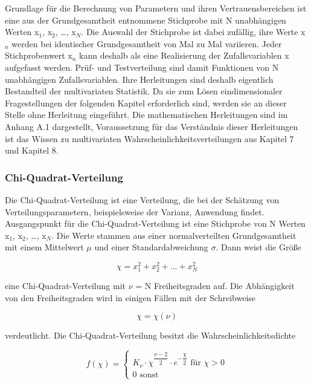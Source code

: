 \noindent Grundlage f\"{u}r die Berechnung von Parametern und ihren Vertrauensbereichen ist eine aus der Grundgesamtheit entnommene Stichprobe mit N unabh\"{a}ngigen Werten x${}_{1}$, x${}_{2}$, {\dots}, x${}_{N}$. Die Auswahl der Stichprobe ist dabei zuf\"{a}llig, ihre Werte x${}_{n}$ werden bei identischer Grundgesamtheit von Mal zu Mal variieren. Jeder Stichprobenwert x${}_{n}$ kann deshalb als eine Realisierung der Zufallsvariablen x aufgefasst werden. Pr\"{u}f- und Testverteilung sind damit Funktionen von N unabh\"{a}ngigen Zufallsvariablen. Ihre Herleitungen sind deshalb eigentlich Bestandteil der multivariaten Statistik. Da sie zum L\"{o}sen eindimensionaler Fragestellungen der folgenden Kapitel erforderlich sind, werden sie an dieser Stelle ohne Herleitung eingef\"{u}hrt. Die mathematischen Herleitungen sind im Anhang A.1 dargestellt, Voraussetzung f\"{u}r das Verst\"{a}ndnis dieser Herleitungen ist das Wissen zu multivariaten Wahrscheinlichkeitsverteilungen aus Kapitel 7 und Kapitel 8.

\subsubsection{Chi-Quadrat-Verteilung}

\noindent Die Chi-Quadrat-Verteilung ist eine Verteilung, die bei der Sch\"{a}tzung von Verteilungsparametern, beispielsweise der Varianz, Anwendung findet. Ausgangspunkt f\"{u}r die Chi-Quadrat-Verteilung ist eine Stichprobe von N Werten x$_{1}$, x$_{2}$, {\dots}, x$_{N}$. Die Werte stammen aus einer normalverteilten Grundgesamtheit mit einem Mittelwert $\mu$ und einer Standardabweichung $\sigma$. Dann weist die Gr\"{o}{\ss}e

\begin{equation}\label{eq:fourtwohundredtwentyeight}
\chi =x_{1}^{2} +x_{2}^{2} +...+x_{N}^{2}
\end{equation}

\noindent eine Chi-Quadrat-Verteilung mit $\nu$ = N Freiheitsgraden auf. Die Abh\"{a}ngigkeit von den Freiheitsgraden wird in einigen F\"{a}llen mit der Schreibweise

\begin{equation}\label{eq:fourtwohundredtwentynine}
\chi =\chi \left(\nu \right)
\end{equation}

\noindent verdeutlicht. Die Chi-Quadrat-Verteilung besitzt die Wahrscheinlichkeitsdichte 

\begin{equation}\label{eq:fourtwohundredthirty}
f\left(\chi \right)=\left\{\begin{array}{l} {K_{\nu } \cdot \chi ^{\dfrac{\nu -2}{2} } \cdot e^{-\dfrac{\chi }{2}} \text{ für } \chi > 0} \\ 
{0 \text{ sonst}} \end{array}\right.
\end{equation}

